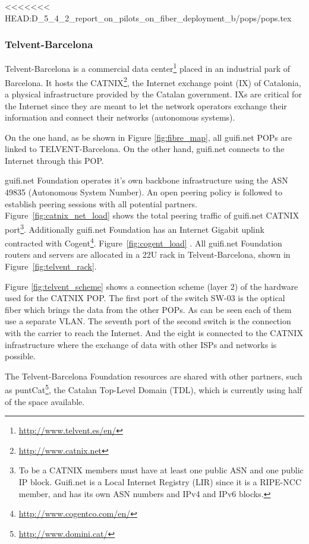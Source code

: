 \FloatBarrier
<<<<<<< HEAD:D_5_4_2_report_on_pilots_on_fiber_deployment_b/pops/pops.tex
\subsubsection{Telvent-Barcelona}

Telvent-Barcelona is a commercial data center\footnote{\url{http://www.telvent.es/en/}} placed in an industrial park of Barcelona. It hosts the CATNIX\footnote{\url{http://www.catnix.net}}, the Internet exchange point (IX) of Catalonia, a physical infrastructure provided by the Catalan government. IXs are critical for the Internet since they are meant to let the network operators exchange their information and connect their networks (autonomous systems). 

On the one hand, as be shown in Figure \ref{fig:fibre_map}, all guifi.net POPs are linked to TELVENT-Barcelona. On the other hand, guifi.net connects to the Internet through this POP.

guifi.net Foundation operates it's own backbone infrastructure using the ASN 49835 (Autonomous System Number). 
An open peering policy is followed to establish peering sessions with all potential partners. Figure~\ref{fig:catnix_net_load} shows the total peering traffic of guifi.net CATNIX port\footnote{To be a CATNIX members must have at least one public ASN and one public IP block. Guifi.net is a Local Internet Registry (LIR) since it is a RIPE-NCC member, and has its own ASN numbers and IPv4 and IPv6 blocks.}. Additionally guifi.net Foundation has an Internet Gigabit uplink contracted with Cogent\footnote{\url{http://www.cogentco.com/en/}}. Figure~\ref{fig:cogent_load} . All guifi.net Foundation routers and servers are allocated in a 22U rack in Telvent-Barcelona, shown in Figure~\ref{fig:telvent_rack}. 


Figure \ref{fig:telvent_scheme} shows a connection scheme (layer 2) of the hardware used for the CATNIX POP. 
The first port of the switch SW-03 is the optical fiber which brings the data from the other POPs. As can be seen each
of them use a separate VLAN. The seventh port of the second switch is the connection with the carrier to reach the Internet.
And the eight is connected to the CATNIX infrastructure where the exchange of data with other ISPs and networks is possible. 


The Telvent-Barcelona Foundation resources are shared with other partners, such as puntCat\footnote{\url{http://www.domini.cat/}}, the Catalan Top-Level Domain (TDL), which is currently using half of the space available.

